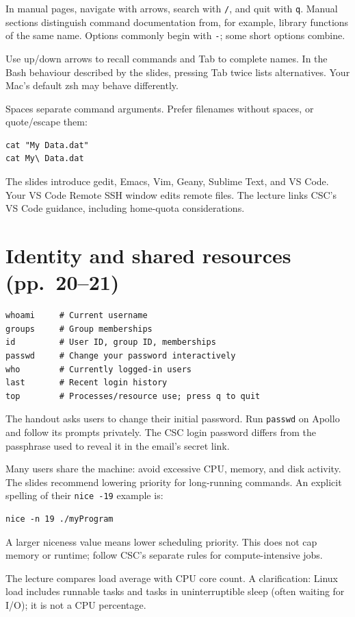 \documentclass[11pt,a4paper]{article}
\begin{document}
In manual pages, navigate with arrows, search with \texttt{/}, and quit with \texttt{q}. Manual sections distinguish command documentation from, for example, library functions of the same name. Options commonly begin with \texttt{-}; some short options combine.

Use up/down arrows to recall commands and Tab to complete names. In the Bash behaviour described by the slides, pressing Tab twice lists alternatives. Your Mac's default zsh may behave differently.

Spaces separate command arguments. Prefer filenames without spaces, or quote/escape them:
\begin{lstlisting}
cat "My Data.dat"
cat My\ Data.dat
\end{lstlisting}
The slides introduce gedit, Emacs, Vim, Geany, Sublime Text, and VS Code. Your VS Code Remote SSH window edits remote files. The lecture links CSC's VS Code guidance, including home-quota considerations.
\section{Identity and shared resources (pp.~20--21)}
\begin{lstlisting}
whoami     # Current username
groups     # Group memberships
id         # User ID, group ID, memberships
passwd     # Change your password interactively
who        # Currently logged-in users
last       # Recent login history
top        # Processes/resource use; press q to quit
\end{lstlisting}
The handout asks users to change their initial password. Run \texttt{passwd} on Apollo and follow its prompts privately. The CSC login password differs from the passphrase used to reveal it in the email's secret link.

Many users share the machine: avoid excessive CPU, memory, and disk activity. The slides recommend lowering priority for long-running commands. An explicit spelling of their \texttt{nice -19} example is:
\begin{lstlisting}
nice -n 19 ./myProgram
\end{lstlisting}
A larger niceness value means lower scheduling priority. This does not cap memory or runtime; follow CSC's separate rules for compute-intensive jobs.

The lecture compares load average with CPU core count. A clarification: Linux load includes runnable tasks and tasks in uninterruptible sleep (often waiting for I/O); it is not a CPU percentage.
\end{document}
